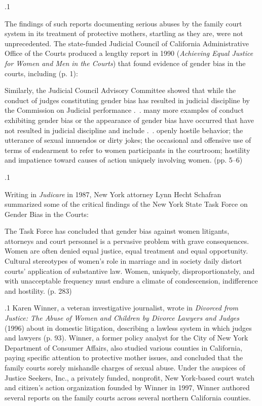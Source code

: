 \documentclass[11pt, twoside]{article}
\begin{document}
{\p.1{%
\:The findings of such reports documenting serious abuses by the family
court system in its treatment of protective mothers, startling as they are,
were not unprecedented. The state-funded Judicial Council of California
Administrative Office of the Courts produced a lengthy report in 1990
(\textit{Achieving Equal Justice for Women and Men in the Courts}) that found
evidence of gender bias in the courts, including  (p. 1):

\begin{blockQuote}
Similarly, the Judicial Council Advisory Committee showed that
while the conduct of judges constituting gender bias has resulted in
judicial discipline by the Commission on Judicial performance .~.
many more examples of conduct exhibiting gender bias or the appearance of gender bias have occurred that have not resulted in
judicial discipline and include .~. openly hostile behavior; the
utterance of sexual innuendos or dirty jokes; the occasional and
offensive use of terms of endearment to refer to women participants in the courtroom; hostility and impatience toward causes of
action uniquely involving women. (pp. 5–6)
\end{blockQuote}
\;
}%

\p.1{%
\:Writing in \textit{Judicare} in 1987, New York attorney Lynn Hecht Schafran
summarized some of the critical findings of the New York State Task
Force on Gender Bias in the Courts:

\begin{blockQuote}
The Task Force has concluded that gender bias against women litigants, attorneys and court personnel is a pervasive problem with
grave consequences. Women are often denied equal justice, equal
treatment and equal opportunity. Cultural stereotypes of women’s
role in marriage and in society daily distort courts’ application of
substantive law. Women, uniquely, disproportionately, and with
unacceptable frequency must endure a climate of condescension,
indifference and hostility. (p. 283)
\end{blockQuote}
\;
}%

\p.1{%
\:Karen Winner, a veteran investigative journalist, wrote in \textit{Divorced
from Justice: The Abuse of Women and Children by Divorce Lawyers
and Judges} (1996) about  in domestic litigation, describing a lawless system in which judges and lawyers
 (p. 93). Winner, a
former policy analyst for the City of New York Department of Consumer
Affairs, also studied various counties in California, paying specific attention to protective mother issues, and concluded that the family courts
sorely mishandle charges of sexual abuse. Under the auspices of Justice
Seekers, Inc., a privately funded, nonprofit, New York-based court watch
and citizen’s action organization founded by Winner in 1997, Winner
authored several reports on the family courts across several northern
California counties.\;
}%

}
\end{document}
